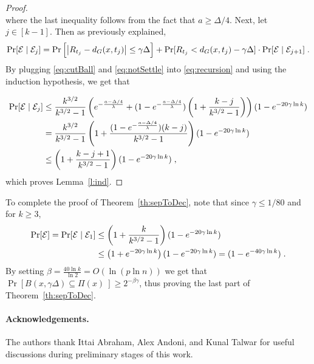 \documentclass[11pt,fleqn]{article}
\begin{document}
\begin{proof}
\begin{equation*}
\end{equation*}
where the last inequality follows from the fact that $a \ge \Delta/4$. 
Next, let $j \in [k-1]$. Then as previously explained,
\begin{equation}
\Pr[{\cal E} \mid {\cal E}_j] = \Pr\Big[\big| R_{t_j} - d_G(x,t_j) \big| \le \gamma \Delta\Big] +\Pr[R_{t_j} < d_G(x,t_j) - \gamma \Delta] \cdot \Pr[{\cal E} \mid {\cal E}_{j+1}] \; .
\label{eq:recursion}
\end{equation}
By plugging \eqref{eq:cutBall} and \eqref{eq:notSettle} into \eqref{eq:recursion} and using the induction hypothesis, we get that

\begin{equation*}
\begin{split}
\Pr[{\cal E} \mid {\cal E}_j] &\le
\frac{k^{3/2}}{k^{3/2} - 1}\left( e^{- \frac{a- \Delta/4}{\lambda}} + ( 1 - e^{- \frac{a - \Delta/4}{\lambda}})\left(1 + \frac{k-j}{k^{3/2}-1} \right) \right)(1-e^{- 20 \gamma \ln k})\\
&= \frac{k^{3/2}}{k^{3/2} - 1}\left( 1 + \frac{( 1 - e^{- \frac{a- \Delta/4}{\lambda}})(k-j)}{k^{3/2}-1} \right)(1-e^{- 20 \gamma \ln k}) \\
&\le \left( 1 + \frac{k-j+1}{k^{3/2} - 1} \right)(1-e^{- 20 \gamma \ln k}) \;,
\end{split}
\end{equation*}
which proves Lemma~\ref{l:ind}.
\end{proof}
To complete the proof of Theorem~\ref{th:sepToDec}, note that since $\gamma \le 1/80$ and for $k \ge 3$,
\begin{equation*}
\begin{split}
\Pr[{\cal E}] =
\Pr[{\cal E} \mid {\cal E}_1] &\le \left( 1 + \frac{k}{k^{3/2} - 1} \right)(1-e^{- 20 \gamma \ln k}) \\ 
&\le  \left( 1 + e^{-20 \gamma \ln k} \right)(1-e^{- 20 \gamma \ln k}) = (1-e^{- 40 \gamma \ln k})\; .
\end{split}
\end{equation*}
By setting $\beta = \frac{40 \ln k}{\ln 2} = O(\ln (p \ln n))$ we get that $\Pr[B(x,\gamma \Delta) \subseteq \Pi(x) \ ] \ge 2^{- \beta \gamma}$, thus proving the last part of Theorem~\ref{th:sepToDec}.



\paragraph{Acknowledgements.}
The authors thank Ittai Abraham, Alex Andoni, and Kunal Talwar for useful discussions during preliminary stages of this work.
\end{document}
